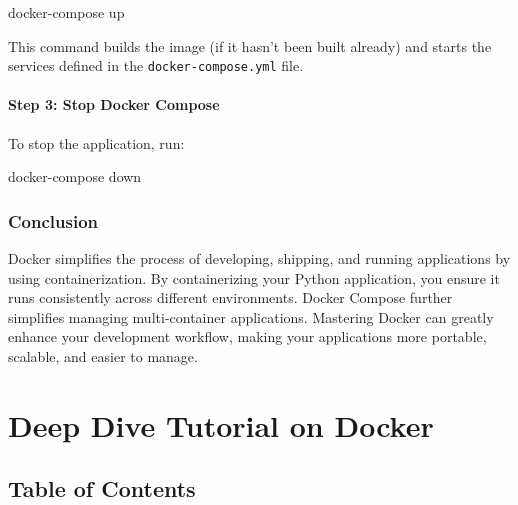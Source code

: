 \documentclass[
  letterpaper,
  DIV=11,
  numbers=noendperiod]{scrreprt}
\newenvironment{Shaded}{\begin{snugshade}}{\end{snugshade}}
\newcommand{\ExtensionTok}[1]{\textcolor[rgb]{0.00,0.23,0.31}{#1}}
\newcommand{\NormalTok}[1]{\textcolor[rgb]{0.00,0.23,0.31}{#1}}
\begin{document}
\begin{Shaded}
\begin{Highlighting}[]
\ExtensionTok{docker{-}compose}\NormalTok{ up}
\end{Highlighting}
\end{Shaded}

This command builds the image (if it hasn't been built already) and
starts the services defined in the \texttt{docker-compose.yml} file.

\subsubsection{Step 3: Stop Docker
Compose}\label{step-3-stop-docker-compose-1}

To stop the application, run:

\begin{Shaded}
\begin{Highlighting}[]
\ExtensionTok{docker{-}compose}\NormalTok{ down}
\end{Highlighting}
\end{Shaded}

\subsection{Conclusion}\label{conclusion-49}

Docker simplifies the process of developing, shipping, and running
applications by using containerization. By containerizing your Python
application, you ensure it runs consistently across different
environments. Docker Compose further simplifies managing multi-container
applications. Mastering Docker can greatly enhance your development
workflow, making your applications more portable, scalable, and easier
to manage.


\chapter{Deep Dive Tutorial on
Docker}\label{deep-dive-tutorial-on-docker}

\section{Table of Contents}\label{table-of-contents-28}
\end{document}

